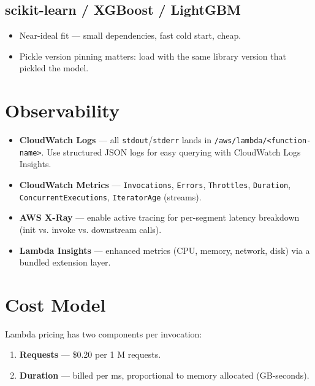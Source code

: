 \documentclass[11pt,a4paper]{article}
\begin{document}
\subsection{scikit-learn / XGBoost / LightGBM}
\begin{itemize}[leftmargin=*,nosep]
    \item Near-ideal fit --- small dependencies, fast cold start, cheap.
    \item Pickle version pinning matters: load with the same library version
          that pickled the model.
\end{itemize}

\section{Observability}

\begin{itemize}[leftmargin=*]
    \item \textbf{CloudWatch Logs} --- all \texttt{stdout}/\texttt{stderr}
          lands in \texttt{/aws/lambda/<function-name>}. Use structured JSON
          logs for easy querying with CloudWatch Logs Insights.
    \item \textbf{CloudWatch Metrics} --- \texttt{Invocations}, \texttt{Errors},
          \texttt{Throttles}, \texttt{Duration}, \texttt{ConcurrentExecutions},
          \texttt{IteratorAge} (streams).
    \item \textbf{AWS X-Ray} --- enable active tracing for per-segment latency
          breakdown (init vs. invoke vs. downstream calls).
    \item \textbf{Lambda Insights} --- enhanced metrics (CPU, memory,
          network, disk) via a bundled extension layer.
\end{itemize}

\section{Cost Model}

Lambda pricing has two components per invocation:

\begin{enumerate}[leftmargin=*,nosep]
    \item \textbf{Requests} --- \$0.20 per 1 M requests.
    \item \textbf{Duration} --- billed per ms, proportional to memory
          allocated (GB-seconds).
\end{enumerate}
\end{document}
